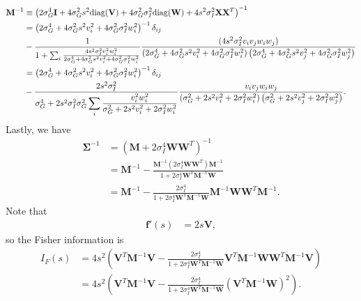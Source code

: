 \documentclass[11pt]{article}
\begin{document}
	\begin{align}
	\mathbf{M}^{-1} &\equiv \left(2\sigma_G^4 \mathbf{I} +4\sigma_G^2 s^2 \text{diag}(\mathbf{V}) + 4\sigma_G^2 \sigma_I^2 \text{diag}(\mathbf{W}) + 4s^2 \sigma_I^2 \mathbf{X}\mathbf{X}^T\right)^{-1} \\
	&= \left(2\sigma_G^4 + 4\sigma_G^2 s^2 v_i^2 + 4\sigma_G^2 \sigma_I^2 w_i^2\right)^{-1}\delta_{ij} \notag \\
	& - \frac{1}{1 + \sum_i\frac{4s^2\sigma_I^2 v_i^2 w_i^2}{2\sigma_G^4 + 4\sigma_G^2 s^2 v_i^2 + 4\sigma_G^2 \sigma_I^2 w_i^2}}\frac{(4s^2 \sigma_I^2 v_i v_j w_i w_j)}{\left(2\sigma_G^4 + 4\sigma_G^2 s^2 v_i^2 + 4\sigma_G^2 \sigma_I^2 w_i^2\right)\left(2\sigma_G^4 + 4\sigma_G^2 s^2 v_j^2 + 4\sigma_G^2 \sigma_I^2 w_j^2\right)} \\
	&= \left(2\sigma_G^4 + 4\sigma_G^2 s^2 v_i^2 + 4\sigma_G^2 \sigma_I^2 w_i^2\right)^{-1}\delta_{ij} \notag \\
	& - \frac{2s^2\sigma_I^2}{\sigma_G^4 +2s^2\sigma_I^2 \sigma_G^2\displaystyle\sum_i\frac{v_i^2 w_i^2}{\sigma_G^2+ 2s^2 v_i^2 + 2 \sigma_I^2 w_i^2}} \frac{ v_i v_j w_i w_j}{\left(\sigma_G^2 + 2s^2 v_i^2 + 2 \sigma_I^2 w_i^2\right)\left(\sigma_G^2 + 2 s^2 v_j^2 + 2\sigma_I^2 w_j^2\right)}.
	\end{align}
	Lastly, we have 
	\begin{align}
	\boldsymbol{\Sigma}^{-1} &= (\mathbf{M} + 2\sigma_I^4 \mathbf{W}\mathbf{W}^T)^{-1} \\
	&= \mathbf{M}^{-1} - \frac{\mathbf{M}^{-1} (2\sigma_I^4 \mathbf{W}\mathbf{W}^T) \mathbf{M}^{-1}}{1 + 2\sigma_I^4 \mathbf{W}^T\mathbf{M}^{-1}\mathbf{W}} \\
	&= \mathbf{M}^{-1} - \frac{2\sigma_I^4}{1 + 2\sigma_I^4 \mathbf{W}^T\mathbf{M}^{-1} \mathbf{W}} \mathbf{M}^{-1}\mathbf{W}\mathbf{W}^T\mathbf{M}^{-1}.
	\end{align}
	Note that
	\begin{align}
	\mathbf{f}'(s) &= 2 s \mathbf{V},
	\end{align}
	so the Fisher information is
	\begin{align}
	I_F(s) &= 4s^2 \left(\mathbf{V}^T \mathbf{M}^{-1} \mathbf{V} - \frac{2\sigma_I^4}{1 + 2\sigma_I^4 \mathbf{W}^T\mathbf{M}^{-1} \mathbf{W}} \mathbf{V}^T \mathbf{M}^{-1} \mathbf{W} \mathbf{W}^T \mathbf{M}^{-1}\mathbf{V}\right) \\
	&= 4s^2 \left(\mathbf{V}^T \mathbf{M}^{-1} \mathbf{V}-  \frac{2\sigma_I^4}{1 + 2\sigma_I^4 \mathbf{W}^T\mathbf{M}^{-1} \mathbf{W}} \left(\mathbf{V}^T\mathbf{M}^{-1} \mathbf{W}\right)^{2}\right).
	\end{align}
\end{document}
